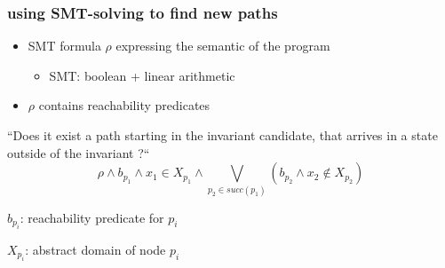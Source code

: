 \documentclass{beamer}
\begin{document}
\begin{frame}
\begin{columns}
\begin{column}{5.5cm}
{
}
\end{column}
\end{columns}
\end{frame}

\begin{frame}
  \frametitle{using SMT-solving to find new paths}
\begin{itemize}
\item SMT formula $\rho$ expressing the semantic of the program
\begin{itemize}
\item SMT: boolean + linear arithmetic
\end{itemize}
\item $\rho$ contains reachability predicates
\end{itemize}
\bigskip
``Does it exist a path starting in the invariant candidate, that arrives in a
state outside of the invariant {?}`` 
\bigskip
$$\rho  \wedge b_{p_1} \wedge x_1 \in X_{p_1} \wedge \bigvee_{p_2 \in succ(p_1)}
 (b_{p_2} \wedge x_2 \notin X_{p_2})$$

\footnotesize{
$b_{p_i}$: reachability predicate for $p_i$

$X_{p_i}$: abstract domain of node $p_i$
}
\end{frame}
\end{document}
